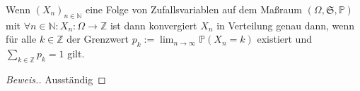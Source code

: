 \begin{lemma}
    Wenn $(X_n)_{n\in\mathbb{N}}$ eine Folge von Zufallsvariablen auf dem Maßraum $(\Omega,\mathfrak{S},\mathbb{P})$ mit $\forall n\in\mathbb{N}:X_n:\Omega\to\mathbb{Z}$ ist dann konvergiert $X_n$ in Verteilung genau dann, wenn für alle $k\in\mathbb{Z}$ der Grenzwert $p_k:=\lim_{n\to\infty}\mathbb{P}(X_n=k)$ existiert und $\sum_{k\in\mathbb{Z}}p_k=1$ gilt.
\end{lemma}
\begin{proof}[Beweis.]
    Ausständig
\end{proof}